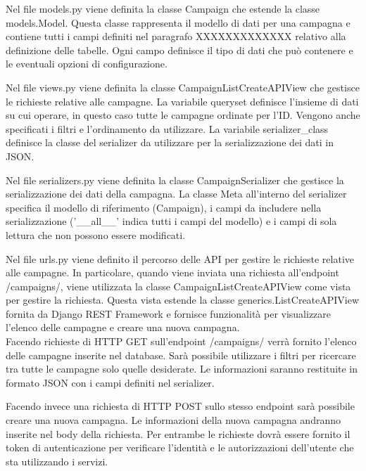 

Nel file models.py viene definita la classe Campaign che estende la classe 
models.Model. Questa classe rappresenta il modello di dati per una campagna e 
contiene tutti i campi definiti nel paragrafo XXXXXXXXXXXXX relativo alla definizione 
delle tabelle. Ogni campo definisce il tipo di dati che può contenere e le 
eventuali opzioni di configurazione. 

Nel file views.py viene definita la classe CampaignListCreateAPIView che 
gestisce le richieste relative alle campagne. La variabile queryset definisce 
l'insieme di dati su cui operare, in questo caso tutte le campagne ordinate per 
l'ID. Vengono anche specificati i  filtri e l’ordinamento da utilizzare. 
La variabile serializer\_class definisce la classe del serializer da utilizzare 
per la serializzazione dei dati in JSON.

Nel file serializers.py viene definita la classe CampaignSerializer che gestisce 
la serializzazione dei dati della campagna. La classe Meta all'interno del 
serializer specifica il modello di riferimento (Campaign), i campi da includere 
nella serializzazione ('\_\_all\_\_' indica tutti i campi del modello) e i campi di 
sola lettura che non possono essere modificati.

Nel file urls.py viene definito il percorso delle API per gestire le richieste 
relative alle campagne. In particolare, quando viene inviata una richiesta all'endpoint 
/campaigns/, viene utilizzata la classe CampaignListCreateAPIView come vista 
per gestire la richiesta. Questa vista estende la classe generics.ListCreateAPIView 
fornita da Django REST Framework e fornisce funzionalità per visualizzare 
l'elenco delle campagne e creare una nuova campagna.\\

Facendo richieste di HTTP GET sull’endpoint /campaigns/ verrà fornito l’elenco 
delle campagne inserite nel database. Sarà possibile utilizzare i filtri per 
ricercare tra tutte le campagne solo quelle desiderate. Le informazioni saranno 
restituite in formato JSON con i campi definiti nel serializer.

Facendo invece una richiesta di HTTP POST sullo stesso endpoint sarà possibile 
creare una nuova campagna. Le informazioni della nuova campagna andranno 
inserite nel body della richiesta.
Per entrambe le richieste dovrà essere fornito il token di autenticazione per 
verificare l’identità e le autorizzazioni dell’utente che sta utilizzando i 
servizi.


